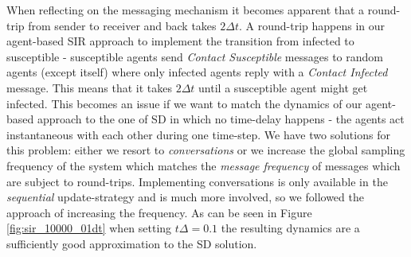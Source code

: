 When reflecting on the messaging mechanism it becomes apparent that a round-trip from sender to receiver and back takes $2 \Delta t$. A round-trip happens in our agent-based SIR approach to implement the transition from infected to susceptible - susceptible agents send \textit{Contact Susceptible} messages to random agents (except itself) where only infected agents reply with a \textit{Contact Infected} message. This means that it takes $2 \Delta t$ until a susceptible agent might get infected. This becomes an issue if we want to match the dynamics of our agent-based approach to the one of SD in which no time-delay happens - the agents act instantaneous with each other during one time-step. 
We have two solutions for this problem: either we resort to \textit{conversations} or we increase the global sampling frequency of the system which matches the \textit{message frequency} of messages which are subject to round-trips. Implementing conversations is only available in the \textit{sequential} update-strategy and is much more involved, so we followed the approach of increasing the frequency. As can be seen in Figure \ref{fig:sir_10000_01dt} when setting $t\Delta = 0.1$ the resulting dynamics are a sufficiently good approximation to the SD solution.
